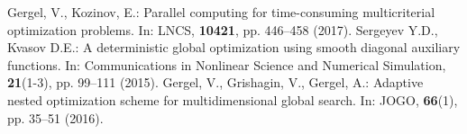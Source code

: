 \documentclass[runningheads]{llncs}
\begin{document}
\begin{thebibliography}{8}
	Gergel, V., Kozinov, E.: Parallel computing for time-consuming multicriterial optimization problems. In: LNCS, \textbf{10421}, pp. 446--458 (2017). 
	Sergeyev Y.D., Kvasov D.E.: A deterministic global optimization using smooth diagonal auxiliary functions. In: Communications in Nonlinear Science and Numerical Simulation, \textbf{21}(1-3), pp. 99--111 (2015).
	Gergel, V., Grishagin, V., Gergel, A.: Adaptive nested optimization scheme for multidimensional global search. In: JOGO, \textbf{66}(1), pp. 35--51 (2016). 

\end{thebibliography}
\end{document}
